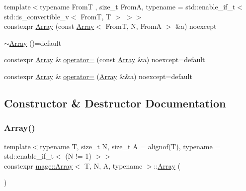 \begin{DoxyCompactItemize}
\item 
{\footnotesize template$<$typename FromT , size\+\_\+t FromA, typename  = std\+::enable\+\_\+if\+\_\+t$<$ std\+::is\+\_\+convertible\+\_\+v$<$ From\+T, T $>$ $>$$>$ }\\constexpr \mbox{\hyperlink{structmage_1_1_array_a950b26208c3546704f42e92c312a93ed}{Array}} (const \mbox{\hyperlink{structmage_1_1_array}{Array}}$<$ FromT, N, FromA $>$ \&a) noexcept
\item 
\mbox{\hyperlink{structmage_1_1_array_a7adc09166915789b93a7a3af118182e0}{$\sim$\+Array}} ()=default
\item 
constexpr \mbox{\hyperlink{structmage_1_1_array}{Array}} \& \mbox{\hyperlink{structmage_1_1_array_a693f811869bcaae12b5308981682affa}{operator=}} (const \mbox{\hyperlink{structmage_1_1_array}{Array}} \&a) noexcept=default
\item 
constexpr \mbox{\hyperlink{structmage_1_1_array}{Array}} \& \mbox{\hyperlink{structmage_1_1_array_ae90a7beb10b5edc39331e465af0d1acc}{operator=}} (\mbox{\hyperlink{structmage_1_1_array}{Array}} \&\&a) noexcept=default
\end{DoxyCompactItemize}


\subsection{Constructor \& Destructor Documentation}
\mbox{\label{structmage_1_1_array_ac1cf5733c005dfb79fb9e5e736098598}} 
\subsubsection{\texorpdfstring{Array()}{Array()}\hspace{0.1cm}{\footnotesize\ttfamily [1/10]}}
{\footnotesize\ttfamily template$<$typename T, size\+\_\+t N, size\+\_\+t A = alignof(\+T), typename  = std\+::enable\+\_\+if\+\_\+t$<$ (\+N != 1) $>$$>$ \\
constexpr \mbox{\hyperlink{structmage_1_1_array}{mage\+::\+Array}}$<$ T, N, A, typename $>$\+::\mbox{\hyperlink{structmage_1_1_array}{Array}} (\begin{DoxyParamCaption}{ }\end{DoxyParamCaption})\hspace{0.3cm}{\ttfamily [noexcept]}}

\mbox{\label{structmage_1_1_array_a1f206f942c1318eb7f57c7e0666bc923}} 
